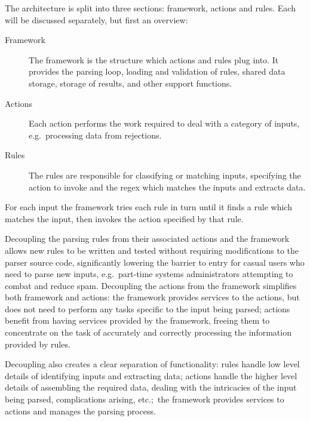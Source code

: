 \documentclass{svmult}
\begin{document}
\label{Architecture}

The architecture is split into three sections: framework, actions and
rules.  Each will be discussed separately, but first an overview:

\begin{description}

    \item [Framework]  The framework is the structure which actions and
        rules plug into.  It provides the parsing loop, loading and
        validation of rules, shared data storage, storage of results, and
        other support functions.

    \item [Actions]  Each action performs the work required to deal with a
        category of inputs, e.g.\ processing data from rejections.

    \item [Rules]  The rules are responsible for classifying or matching
        inputs, specifying the action to invoke and the regex which matches
        the inputs and extracts data.

\end{description}

For each input the framework tries each rule in turn until it finds a rule
which matches the input, then invokes the action specified by that rule.

Decoupling the parsing rules from their associated actions and the
framework allows new rules to be written and tested without requiring
modifications to the parser source code, significantly lowering the barrier
to entry for casual users who need to parse new inputs, e.g.\ part-time
systems administrators attempting to combat and reduce spam.  Decoupling
the actions from the framework simplifies both framework and actions: the
framework provides services to the actions, but does not need to perform
any tasks specific to the input being parsed; actions benefit from having
services provided by the framework, freeing them to concentrate on the task
of accurately and correctly processing the information provided by rules.

Decoupling also creates a clear separation of functionality: rules handle
low level details of identifying inputs and extracting data; actions handle
the higher level details of assembling the required data, dealing with the
intricacies of the input being parsed, complications arising, etc.;\ the
framework provides services to actions and manages the parsing process.
\end{document}
